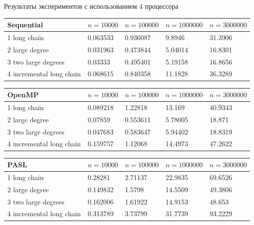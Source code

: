 \documentclass[hyperref=unicode,graphics=pdflatex,13pt]{beamer}
\begin{document}
\begin{frame}[shrink]{Результаты экспериментов с использованием 4 процессора}

\begin{table}[!ht]
\centering
\begin{tabular}{|l|l|l|l|l|}\hline
Sequential	& $n=10000$ & $n=100000$ & $n=1000000$ & $n=3000000$ \\\hline
1 long chain & 0.063533	& 0.936087 & 9.8946 & 31.3906 \\\hline
2 large degree & 0.031963 & 0.473844 & 5.04014 & 16.8301 \\\hline
3 two large degrees & 0.03333 & 0.495401 & 5.19158 & 16.8656 \\\hline
4 incremental long chain & 0.068615 & 0.840358 & 11.1828 & 36.3289 \\\hline
\end{tabular}
\end{table}

\begin{table}[!ht]
\centering
\begin{tabular}{|l|l|l|l|l|}\hline
OpenMP	& $n=10000$ & $n=100000$ & $n=1000000$ & $n=3000000$ \\\hline
1 long chain & 0.089218 & 1.22818 & 13.169 & 40.9343 \\\hline
2 large degree & 0.07859 & 0.553611 & 5.78005 & 18.871 \\\hline
3 two large degrees & 0.047683 & 0.583647 & 5.94402 & 18.8319 \\\hline
4 incremental long chain & 0.159757 & 1.12068 & 14.4973 & 47.2622 \\\hline
\end{tabular}
\end{table}

\begin{table}[!ht]
\centering
\begin{tabular}{|l|l|l|l|l|}\hline
PASL	& $n=10000$ & $n=100000$ & $n=1000000$ & $n=3000000$ \\\hline
1 long chain & 0.28281	& 2.71137 & 22.9835 & 69.6526 \\\hline
2 large degree & 0.149832 & 1.5798 & 14.5509 & 49.3806 \\\hline
3 two large degrees & 0.162006 & 1.61922 & 14.9153 & 48.653 \\\hline
4 incremental long chain & 0.313789 & 3.73799 & 31.7739 & 93.2229 \\\hline
\end{tabular}
\end{table}
\end{frame}
\end{document}
